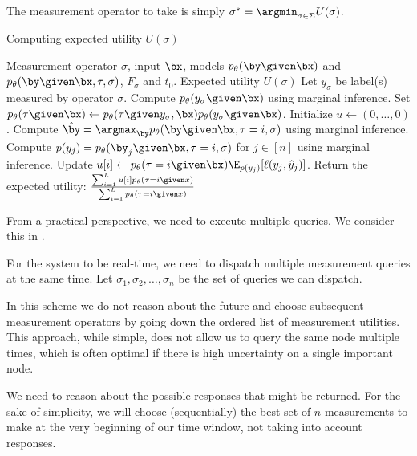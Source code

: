 The measurement operator to take is simply $\sigma^* = \argmin_{\sigma \in \Sigma} U(\sigma)$.

\begin{algorithm}
\renewcommand{\algorithmicrequire}{\textbf{Input:}}
\renewcommand{\algorithmicensure}{\textbf{Output:}}
  \caption{Computing expected utility $U(\sigma)$}
  \label{algo:expected-utility}
  \begin{algorithmic}[1]
    \REQUIRE Measurement operator $\sigma$, input $\bx$, models $p_\theta(\by \given \bx)$ and $p_\theta(\by \given \bx, \tau, \sigma)$, $F_\sigma$ and $t_0$.
    \ENSURE Expected utility $U(\sigma)$
    \STATE Let $y_\sigma$ be label(s) measured by operator $\sigma$.
    \STATE Compute $p_\theta(y_\sigma \given \bx)$ using marginal inference.
    \STATE Set $p_\theta(\tau \given \bx) \gets p_\theta(\tau \given y_\sigma, \bx) p_\theta(y_\sigma \given \bx)$.
    \STATE Initialize $u \gets (0, \dots, 0)$.
    \STATE Compute $\byt = \argmax_{\by} p_\theta(\by \given \bx, \tau = i, \sigma)$ using marginal inference.
    \STATE Compute $p(y_j) = p_\theta(\by_j \given \bx, \tau = i, \sigma)$ for $j \in [n]$ using marginal inference.
    \STATE Update $u[i] \gets \p(\tau = i \given \bx) \E_{p(y_j)}[\ell(y_j, \yt_j)]$.
    \ENDFOR
    \STATE Return the expected utility: $\frac{\sum_{i=1}^L u[i] p_\theta(\tau = i \given x)}{\sum_{i=1}^L p_\theta(\tau = i \given x)}$
  \end{algorithmic}
\end{algorithm}

From a practical perspective, we need to execute multiple queries. We consider this in .



For the system to be real-time, we need to dispatch multiple measurement queries at the same time.
Let $\sigma_1, \sigma_2, \dots, \sigma_n$ be the set of queries we can dispatch.

\begin{note}
In this scheme we do not reason about the future and choose subsequent measurement operators by going down the ordered list of measurement utilities.
This approach, while simple, does not allow us to query the same node multiple times, which is often optimal if there is high uncertainty on a single important node.
\end{note}

We need to reason about the possible responses that might be returned.
For the sake of simplicity, we will choose (sequentially) the best set of $n$ measurements to make at the very beginning of our time window, not taking into account responses.

